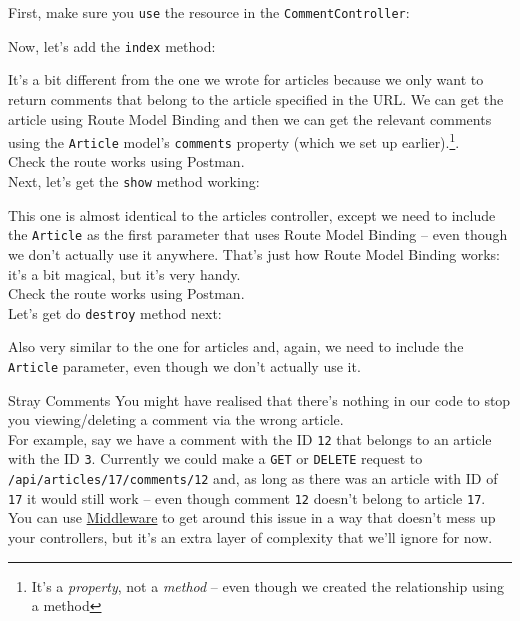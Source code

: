 First, make sure you \texttt{use} the resource in the \texttt{CommentController}:



Now, let's add the \texttt{index} method:


It's a bit different from the one we wrote for articles because we only want to return comments that belong to the article specified in the URL. We can get the article using Route Model Binding and then we can get the relevant comments using the \texttt{Article} model's \texttt{comments} property (which we set up earlier).\footnote{It's a \textit{property}, not a \textit{method} – even though we created the relationship using a method}.
\\

Check the route works using Postman.
\\

Next, let's get the \texttt{show} method working:


This one is almost identical to the articles controller, except we need to include the \texttt{Article} as the first parameter that uses Route Model Binding – even though we don't actually use it anywhere. That's just how Route Model Binding works: it's a bit magical, but it's very handy.
\\

Check the route works using Postman.
\\

Let's get do \texttt{destroy} method next:


Also very similar to the one for articles and, again, we need to include the \texttt{Article} parameter, even though we don't actually use it.

\begin{infobox}{Stray Comments}
    You might have realised that there's nothing in our code to stop you viewing/deleting a comment via the wrong article.
    \\

    For example, say we have a comment with the ID \texttt{12} that belongs to an article with the ID \texttt{3}. Currently we could make a \texttt{GET} or \texttt{DELETE} request to \\ \texttt{/api/articles/17/comments/12} and, as long as there was an article with ID of \texttt{17} it would still work – even though comment \texttt{12} doesn't belong to article \texttt{17}.
    \\

    You can use \href{http://laravel.com/docs/master/middleware}{Middleware} to get around this issue in a way that doesn't mess up your controllers, but it's an extra layer of complexity that we'll ignore for now.
\end{infobox}

